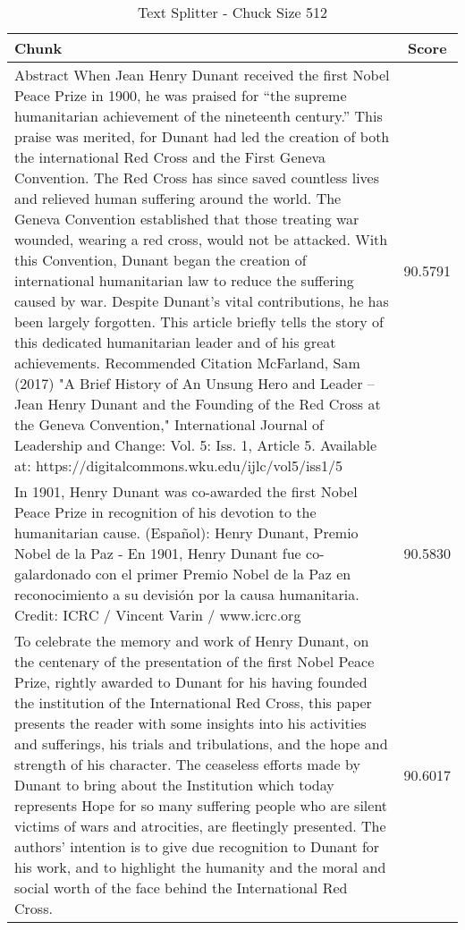 \begin{table}[h!]
    \footnotesize
    \begin{xltabular}{\linewidth}{X|c}
        \toprule
        \textbf{Chunk} & \textbf{Score} \\
        \midrule
        Abstract When Jean Henry Dunant received the first Nobel Peace Prize in 1900, he was praised for “the supreme humanitarian achievement of the nineteenth century.” This praise was merited, for Dunant had led the creation of both the international Red Cross and the First Geneva Convention. The Red Cross has since saved countless lives and relieved human suffering around the world. The Geneva Convention established that those treating war wounded, wearing a red cross, would not be attacked. With this Convention, Dunant began the creation of international humanitarian law to reduce the suffering caused by war. Despite Dunant’s vital contributions, he has been largely forgotten. This article briefly tells the story of this dedicated humanitarian leader and of his great achievements. Recommended Citation McFarland, Sam (2017) "A Brief History of An Unsung Hero and Leader – Jean Henry Dunant and the Founding of the Red Cross at the Geneva Convention," International Journal of Leadership and Change: Vol. 5: Iss. 1, Article 5. Available at: https://digitalcommons.wku.edu/ijlc/vol5/iss1/5 & 90.5791\\ \hline
        In 1901, Henry Dunant was co-awarded the first Nobel Peace Prize in recognition of his devotion to the humanitarian cause. (Español): Henry Dunant, Premio Nobel de la Paz - En 1901, Henry Dunant fue co-galardonado con el primer Premio Nobel de la Paz en reconocimiento a su devisión por la causa humanitaria. Credit: ICRC / Vincent Varin / www.icrc.org & 90.5830\\ \hline
        To celebrate the memory and work of Henry Dunant, on the centenary of the presentation of the first Nobel Peace Prize, rightly awarded to Dunant for his having founded the institution of the International Red Cross, this paper presents the reader with some insights into his activities and sufferings, his trials and tribulations, and the hope and strength of his character. The ceaseless efforts made by Dunant to bring about the Institution which today represents Hope for so many suffering people who are silent victims of wars and atrocities, are fleetingly presented. The authors' intention is to give due recognition to Dunant for his work, and to highlight the humanity and the moral and social worth of the face behind the International Red Cross. & 90.6017 \\
        \bottomrule
    \end{xltabular}
    \caption{Text Splitter - Chuck Size 512}
    \label{tab:table-text-splitter}
\end{table}

